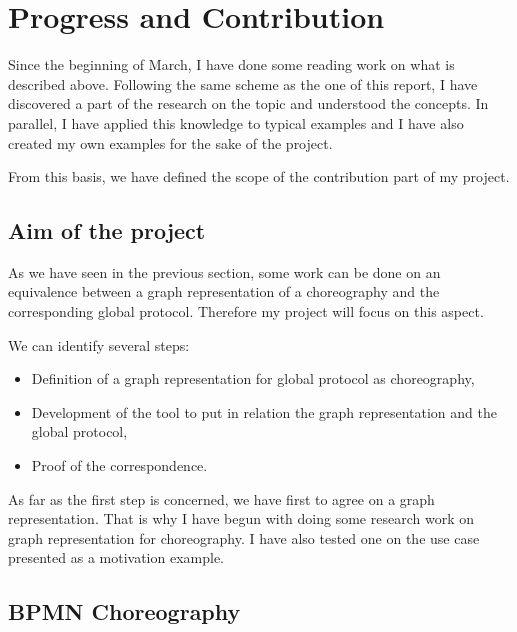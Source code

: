 \documentclass{article}
\begin{document}
\section{Progress and Contribution}

Since the beginning of March, I have done some reading work on what is described above. Following the same scheme as the one of this report, I have discovered a part of the research on the topic and understood the concepts. In parallel, I have applied this knowledge to typical examples and I have also created my own examples for the sake of the project. 

From this basis, we have defined the scope of the contribution part of my project. 

\subsection{Aim of the project}

As we have seen in the previous section, some work can be done on an equivalence between a graph representation of a choreography and the corresponding global protocol. Therefore my project will focus on this aspect.

We can identify several steps:
\begin{itemize}
\item Definition of a graph representation for global protocol as choreography,
\item Development of the tool to put in relation the graph representation and the global protocol,
\item Proof of the correspondence.
\end{itemize}

As far as the first step is concerned, we have first to agree on a graph representation. That is why I have begun with doing some research work on graph representation for choreography. I have also tested one on the use case presented as a motivation example.

\subsection{BPMN Choreography}
\end{document}

